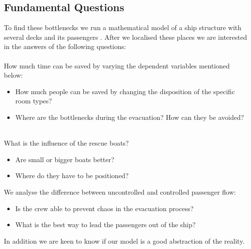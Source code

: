 \documentclass[11pt]{article}
\begin{document}
\subsection{Fundamental Questions}
To find these bottlenecks we run a mathematical model of a ship structure  with several decks and its passengers \cite{shipdecks}. After we localised these places we are interested in the answers of the following questions:\\\\

\newpage
How much time can be saved by varying the dependent variables mentioned below:
\begin{itemize}
\item How much people can be saved by changing the disposition of the specific room types?
\item Where are the bottlenecks during the evacuation? How can they be avoided?\\\\
\end{itemize}
What is the influence of the rescue boats?
\begin{itemize}
\item Are small or bigger boats better?
\item Where do they have to be positioned?
\end{itemize}
We analyse the difference between uncontrolled and controlled passenger flow:
\begin{itemize}
\item Is the crew able to prevent chaos in the evacuation process?
\item What is the best way to lead the passengers out of the ship?
\end{itemize}
In addition we are keen to know if our model is a good abstraction of the reality.
\end{document}
